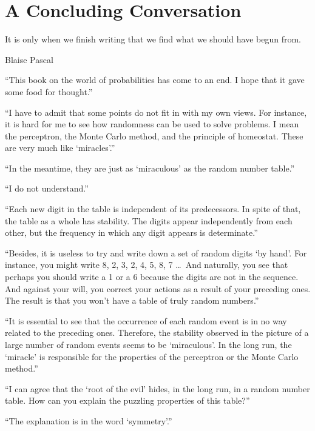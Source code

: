 \chapter*{A Concluding Conversation}
\epigraph{It is only when we finish writing that we find what we should have begun from.}{Blaise Pascal}

\begin{dialogue}

\athr ``This book on the world of probabilities has come to an
end. I hope that it gave some food for thought.''


\rdr ``I have to admit that some points do not fit in with my own
views. For instance, it is hard for me to see how randomness can be
used to solve problems. I mean the perceptron, the Monte Carlo
method, and the principle of homeostat. These are very much like
`miracles'.''

\athr ``In the meantime, they are just as `miraculous' as the
random number table.''

\rdr ``I do not understand.''

\athr ``Each new digit in the table is independent of its
predecessors. In spite of that, the table as a whole has stability. The
digits appear independently from each other, but the frequency in
which any digit appears is determinate.''

``Besides, it is useless to try and write down a set of random digits
`by hand'. For instance, you might write 8, 2, 3, 2, 4, 5, 8, 7 
\ldots{}\, And naturally, you see that perhaps you should write a 1 or a 6 because the digits are not in the sequence. And against your will, you correct your actions as a result of your preceding ones. The result is that you won't have a table of truly random numbers.''

``It is essential to see that the occurrence of each random event is in
no way related to the preceding ones. Therefore, the stability observed
in the picture of a large number of random events seems to be
`miraculous'. In the long run, the `miracle' is responsible for the
properties of the perceptron or the Monte Carlo method.''

\rdr ``I can agree that the `root of the evil' hides, in the long run,
in a random number table. How can you explain the puzzling
properties of this table?''

\athr ``The explanation is in the word `symmetry'.''


\end{dialogue}
